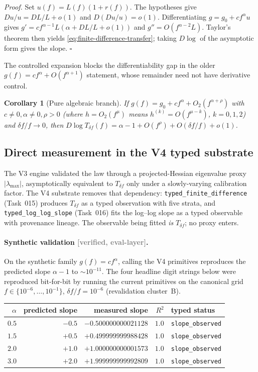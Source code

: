\documentclass[11pt,a4paper]{article}
\newtheorem{corollary}{Corollary}
\newcommand{\status}[1]{\textcolor{gray}{\small\textsf{[#1]}}}
\begin{document}
\noindent\emph{Proof.}
Set $u(f)=L(f)(1+r(f))$. The hypotheses give $Du/u=DL/L+o(1)$ and $D(Du/u)=o(1)$. Differentiating $g=g_0+c f^{\alpha}u$ gives $g'=c f^{\alpha-1}L(\alpha+DL/L+o(1))$ and $g''=O(f^{\alpha-2}L)$. Taylor's theorem then yields \eqref{eq:finite-difference-transfer}; taking $D\log$ of the asymptotic form gives the slope. \hfill$\square$

\noindent The controlled expansion blocks the differentiability gap in the older $g(f)=cf^\alpha+O(f^{\alpha+1})$ statement, whose remainder need not have derivative control.

\begin{corollary}[Pure algebraic branch]\label{cor:pure-algebraic}
If $g(f)=g_0+c f^\alpha+O_2(f^{\alpha+\rho})$ with $c\ne0,\alpha\ne0,\rho>0$ (where $h=O_2(f^\mu)$ means $h^{(k)}=O(f^{\mu-k})$, $k=0,1,2$) and $\delta f/f\to0$, then $D\log T_{\delta f}(f)=\alpha-1+O(f^\rho)+O(\delta f/f)+o(1)$.
\end{corollary}

\subsection{Direct measurement in the V4 typed substrate}\label{sec:v4-direct}

The V3 engine validated the law through a projected-Hessian eigenvalue proxy $|\lambda_{\max}|$, asymptotically equivalent to $T_{\delta f}$ only under a slowly-varying calibration factor. The V4 substrate removes that dependency: \texttt{typed\_finite\_difference} (Task~015) produces $T_{\delta f}$ as a typed observation with five strata, and \texttt{typed\_log\_log\_slope} (Task~016) fits the log--log slope as a typed observable with provenance lineage. The observable being fitted \emph{is} $T_{\delta f}$; no proxy enters.

\paragraph{Synthetic validation \status{verified, eval-layer}.} On the synthetic family $g(f)=c f^\alpha$, calling the V4 primitives reproduces the predicted slope $\alpha-1$ to $\sim10^{-11}$. The four headline digit strings below were reproduced bit-for-bit by running the current primitives on the canonical grid $f\in\{10^{-6},\dots,10^{-1}\}$, $\delta f/f=10^{-6}$ (revalidation cluster~B).

\begin{center}
\begin{tabular}{rrrrl}
\toprule
$\alpha$ & predicted slope & measured slope & $R^2$ & typed status\\
\midrule
$0.5$ & $-0.5$ & $-0.500000000021128$ & $1.0$ & \texttt{slope\_observed}\\
$1.5$ & $+0.5$ & $+0.499999999988428$ & $1.0$ & \texttt{slope\_observed}\\
$2.0$ & $+1.0$ & $+1.000000000001573$ & $1.0$ & \texttt{slope\_observed}\\
$3.0$ & $+2.0$ & $+1.999999999992809$ & $1.0$ & \texttt{slope\_observed}\\
\bottomrule
\end{tabular}
\end{center}
\end{document}
